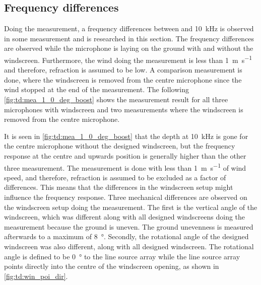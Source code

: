 \subsection{Frequency differences}\label{sec:des:freq_boost}
Doing the measurement, a frequency differences between  and \SI{10}{\kilo\hertz} is observed in some measurement and is researched in this section. The frequency differences are observed while the microphone is laying on the ground with and without the windscreen. Furthermore, the wind doing the measurement is less than \SI{1}{\meter\per\second} and therefore, refraction is assumed to be low. A comparison measurement is done, where the windscreen is removed from the centre microphone since the wind stopped at the end of the measurement. The following \autoref{fig:td:mea_1_0_deg_boost} shows the measurement result for all three microphones with windscreen and two measurements where the windscreen is removed from the centre microphone. 


It is seen in \autoref{fig:td:mea_1_0_deg_boost} that the depth at \SI{10}{\kilo\hertz} is gone for the centre microphone without the designed windscreen, but the frequency response at the centre and upwards position is generally higher than the other three measurement. The measurement is done with less than \SI{1}{\meter\per\second} of wind speed, and therefore, refraction is assumed to be excluded as a factor of differences. This means that the differences in the windscreen setup might influence the frequency response. 
Three mechanical differences are observed on the windscreen setup doing the measurement. The first is the vertical angle of the windscreen, which was different along with all designed windscreens doing the measurement because the ground is uneven. The ground unevenness is measured afterwards to a maximum of \SI{8}{\degree}. Secondly, the rotational angle of the designed windscreen was also different, along with all designed windscreen. The rotational angle is defined to be \SI{0}{\degree} to the line source array while the line source array points directly into the centre of the windscreen opening, as shown in \autoref{fig:td:win_poi_dir}.


